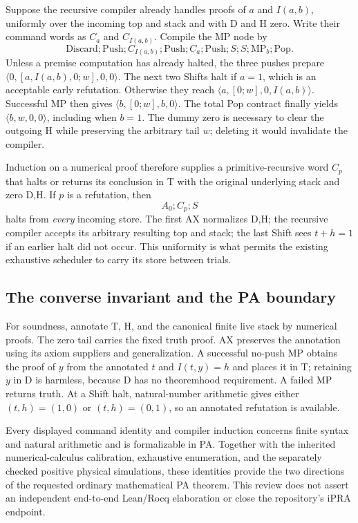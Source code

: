 Suppose the recursive compiler already handles proofs of $a$ and
$I(a,b)$, uniformly over the incoming top and stack and with D and H
zero. Write their command words as $C_a$ and $C_{I(a,b)}$.
Compile the MP node by
\[
 \mathrm{Discard};\mathrm{Push};
 C_{I(a,b)};\mathrm{Push};C_a;\mathrm{Push};
 S;S;\mathrm{MP}_b;\mathrm{Pop}.
\]
Unless a premise computation has already halted, the three pushes
prepare $\langle0,[a,I(a,b),0;w],0,0\rangle$.
The next two Shifts halt if $a=1$, which is an acceptable early
refutation. Otherwise they reach
$\langle a,[0;w],0,I(a,b)\rangle$.
Successful MP then gives
$\langle b,[0;w],b,0\rangle$.
The total Pop contract finally yields
$\langle b,w,0,0\rangle$, including when $b=1$.
The dummy zero is necessary to clear the outgoing H while preserving
the arbitrary tail $w$; deleting it would invalidate the compiler.

Induction on a numerical proof therefore supplies a primitive-recursive
word $C_p$ that halts or returns its conclusion in T with the original
underlying stack and zero D,H. If $p$ is a refutation, then
\[
             A_0;C_p;S
\]
halts from \emph{every} incoming store. The first AX normalizes D,H;
the recursive compiler accepts its arbitrary resulting top and stack;
the last Shift sees $t+h=1$ if an earlier halt did not occur. This
uniformity is what permits the existing exhaustive scheduler to carry
its store between trials.

\subsection{The converse invariant and the PA boundary}

For soundness, annotate T, H, and the canonical finite live stack by
numerical proofs. The zero tail carries the fixed truth proof. AX
preserves the annotation using its axiom suppliers and generalization.
A successful no-push MP obtains the proof of $y$ from the annotated
$t$ and $I(t,y)=h$ and places it in T; retaining $y$ in D is harmless,
because D has no theoremhood requirement. A failed MP returns truth.
At a Shift halt, natural-number arithmetic gives either $(t,h)=(1,0)$
or $(t,h)=(0,1)$, so an annotated refutation is available.

Every displayed command identity and compiler induction concerns finite
syntax and natural arithmetic and is formalizable in PA. Together with
the inherited numerical-calculus calibration, exhaustive enumeration,
and the separately checked positive physical simulations, these
identities provide the two directions of the requested ordinary
mathematical PA theorem. This review does not assert an independent
end-to-end Lean/Rocq elaboration or close the repository's iPRA endpoint.
